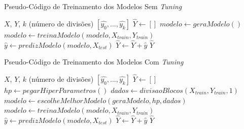 \begin{algorithm}
\caption{Pseudo-Código de Treinamento dos Modelos Sem \textit{Tuning}}
\begin{algorithmic}
\label{algo:training}
\REQUIRE $X$, $Y$, $k$ (número de divisões)
\ENSURE $[\hat{y_0}, ..., \hat{y_k}]$
\STATE $\hat{Y} \leftarrow [] $
\newline
{} 
    \STATE $modelo \leftarrow geraModelo()$
    \STATE $modelo \leftarrow treinaModelo(modelo, X_{train}, Y_{train})$ 
    \newline
    \STATE $\hat{y} \leftarrow predizModelo(modelo, X_{test}) $
    \STATE $\hat{Y} \leftarrow \hat{Y} + \hat{y}$
\ENDFOR
\newline
\RETURN $\hat{Y}$
\end{algorithmic}
\end{algorithm}

\begin{algorithm}
\caption{Pseudo-Código de Treinamento dos Modelos Com \textit{Tuning}}
\begin{algorithmic}
\label{algo:tuned_training}
\REQUIRE $X$, $Y$, $k$ (número de divisões)
\ENSURE $[\hat{y_0}, ..., \hat{y_k}]$
\STATE $\hat{Y} \leftarrow [] $ 
\newline
{} 
    \STATE $hp \leftarrow pegarHiperParametros()$
    \STATE $dados \leftarrow divisaoBlocos(X_{train}, Y_{train}, 1)$
    \STATE $modelo \leftarrow escolheMelhorModelo(geraModelo, hp, dados)$
    \newline
    \STATE $modelo \leftarrow treinaModelo(modelo, X_{train}, Y_{train})$ 
    \newline
    \STATE $\hat{y} \leftarrow predizModelo(modelo, X_{test}) $
    \STATE $\hat{Y} \leftarrow \hat{Y} + \hat{y}$
    \newline
\ENDFOR
\newline
\RETURN $\hat{Y}$
\end{algorithmic}
\end{algorithm}